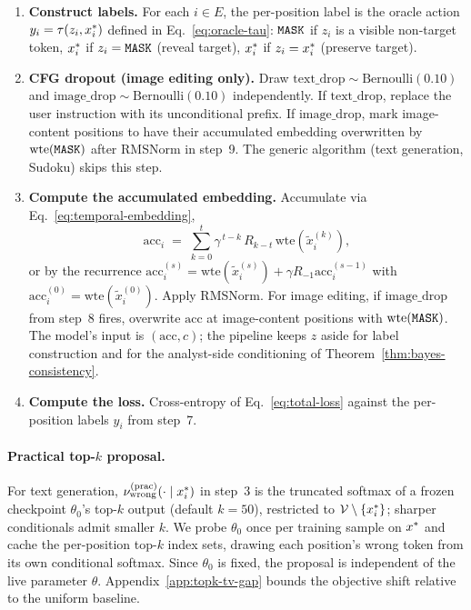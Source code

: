 \begin{enumerate}
    \item \textbf{Construct labels.} For each $i \in E$, the per-position label is the oracle action $y_i = \tau(z_i, x^{\ast}_i)$ defined in Eq.~\eqref{eq:oracle-tau}: $\texttt{MASK}$ if $z_i$ is a visible non-target token, $x^{\ast}_i$ if $z_i = \texttt{MASK}$ (reveal target), $x^{\ast}_i$ if $z_i = x^{\ast}_i$ (preserve target).

    \item \textbf{CFG dropout (image editing only).} Draw $\text{text\_drop} \sim \mathrm{Bernoulli}(0.10)$ and $\text{image\_drop} \sim \mathrm{Bernoulli}(0.10)$ independently. If $\text{text\_drop}$, replace the user instruction with its unconditional prefix. If $\text{image\_drop}$, mark image-content positions to have their accumulated embedding overwritten by $\mathrm{wte}(\texttt{MASK})$ after RMSNorm in step~9. The generic algorithm (text generation, Sudoku) skips this step.

    \item \textbf{Compute the accumulated embedding.} Accumulate via Eq.~\eqref{eq:temporal-embedding},
    \[
    \mathrm{acc}_i \;=\; \textstyle\sum_{k=0}^{t} \gamma^{\,t-k}\, R_{k-t}\, \mathrm{wte}(\tilde{x}_i^{(k)}),
    \]
    or by the recurrence $\mathrm{acc}_i^{(s)} = \mathrm{wte}(\tilde{x}_i^{(s)}) + \gamma R_{-1} \mathrm{acc}_i^{(s-1)}$ with $\mathrm{acc}_i^{(0)} = \mathrm{wte}(\tilde{x}_i^{(0)})$. Apply RMSNorm. For image editing, if $\text{image\_drop}$ from step~8 fires, overwrite $\mathrm{acc}$ at image-content positions with $\mathrm{wte}(\texttt{MASK})$. The model's input is $(\mathrm{acc}, c)$; the pipeline keeps $z$ aside for label construction and for the analyst-side conditioning of Theorem~\ref{thm:bayes-consistency}.

    \item \textbf{Compute the loss.} Cross-entropy of Eq.~\eqref{eq:total-loss} against the per-position labels $y_i$ from step~7.
\end{enumerate}

\paragraph{Practical top-$k$ proposal.}
For text generation, $\nu^{(\mathrm{prac})}_{\mathrm{wrong}}(\cdot \mid x^{\ast}_i)$ in step~3 is the truncated softmax of a frozen checkpoint $\theta_0$'s top-$k$ output (default $k = 50$), restricted to $\mathcal{V} \setminus \{x^{\ast}_i\}$; sharper conditionals admit smaller $k$. We probe $\theta_0$ once per training sample on $x^{\ast}$ and cache the per-position top-$k$ index sets, drawing each position's wrong token from its own conditional softmax. Since $\theta_0$ is fixed, the proposal is independent of the live parameter $\theta$. Appendix~\ref{app:topk-tv-gap} bounds the objective shift relative to the uniform baseline.


